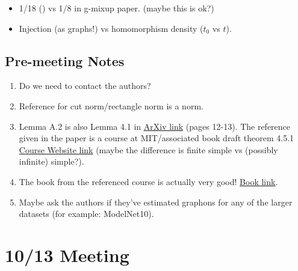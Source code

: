 \documentclass[12pt]{amsart}
\begin{document}
\begin{itemize}
    \item 1/18 (\cite{lov-sze}) vs 1/8 in g-mixup paper. (maybe this is ok?)
    \item Injection (as graphs!) vs homomorphism density ($t_0$ vs $t$).
\end{itemize}

\subsection{Pre-meeting Notes}

\begin{enumerate}
    \item Do we need to contact the authors?
    \item Reference for cut norm/rectangle norm is a norm.
    \item Lemma A.2 is also Lemma 4.1 in \cite{lov-sze} \href{https://arxiv.org/pdf/math/0408173.pdf}{ArXiv link} (pages 12-13). The reference given in the paper is a course at MIT/associated book draft theorem 4.5.1 \href{https://yufeizhao.com/gtac/}{Course Website link} (maybe the difference is finite simple vs (possibly infinite) simple?).
    \item The book from the referenced course is actually very good! \href{https://yufeizhao.com/gtacbook/}{Book link}.
    \item Maybe ask the authors if they've estimated graphons for any of the larger datasets (for example: ModelNet10).
\end{enumerate}

\section{10/13 Meeting}
\end{document}
